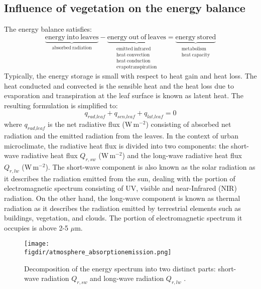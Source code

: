 \subsection{Influence of vegetation on the energy balance}

The energy balance satisfies:
\begin{equation}
\underbrace{\mathrm{energy\ into\ leaves}}_{\mathrm{absorbed\ radiation}}
- \underbrace{\mathrm{energy\ out\ of\ leaves} }_{\substack{\mathrm{emitted\ infrared}\\\mathrm{heat\ convection}\\\mathrm{heat\ conduction}\\\mathrm{evapotranspiration}}} = \underbrace{\mathrm{energy\ stored}}_{\substack{\mathrm{metabolism}\\\mathrm{heat\ capacity}}}
\end{equation}
Typically, the energy storage is small with respect to heat gain and heat loss. The heat conducted and convected is the sensible heat and the heat loss due to evaporation and transpiration at the leaf surface is known as latent heat. The resulting formulation is simplified to:
\begin{equation}
q_{\textit{rad,leaf}} + q_{\textit{sen,leaf}} + q_{\textit{lat,leaf}} = 0
\end{equation}
where $q_{\textit{rad,leaf}}$ is the net radiative flux (W\,m$^{-2}$) consisting of absorbed net radiation and the emitted radiation from the leaves. In the context of urban microclimate, the radiative heat flux is divided into two components: the short-wave radiative heat flux $Q_{r,sw}$ (W\,m$^{-2}$) and the long-wave radiative heat flux $Q_{r,lw}$ (W\,m$^{-2}$). The short-wave component is also known as the solar radiation as it describes the radiation emitted from the sun, dealing with the portion of electromagnetic spectrum consisting of UV, visible and near-Infrared (NIR) radiation. On the other hand, the long-wave component is known as thermal radiation as it describes the radiation emitted by terrestrial elements such as buildings, vegetation, and clouds. The portion of electromagnetic spectrum it occupies is above 2-5 $\mu$m. 

\begin{figure}[t]
	\centering
	\texttt{[image: \\figdir/atmosphere\_absorptionemission.png]}
	\caption{Decomposition of the energy spectrum into two distinct parts: short-wave radiation $Q_{r,sw}$ and long-wave radiation $Q_{r,lw}$ \citep{Oke2017a}.}
	\label{fig:atmosphere_absorptionemission}
\end{figure}

